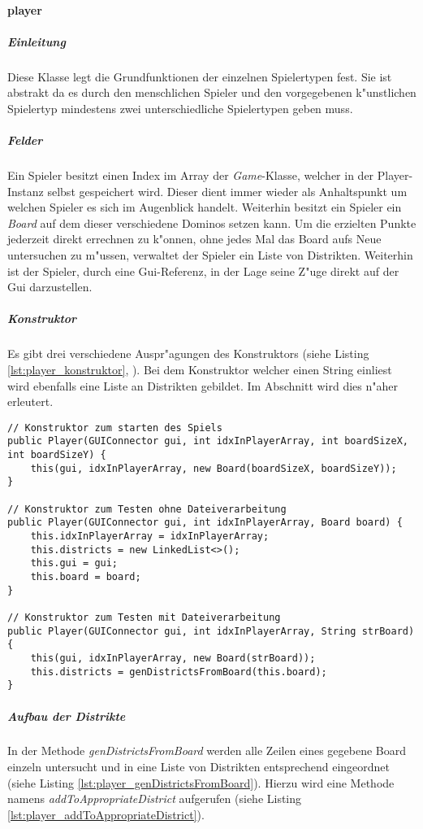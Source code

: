 \paragraph{player}
\label{par:Player}
\subparagraph{Einleitung}
Diese Klasse legt die Grundfunktionen der einzelnen Spielertypen fest. Sie ist abstrakt da es durch den menschlichen Spieler und den vorgegebenen k"unstlichen Spielertyp mindestens zwei unterschiedliche Spielertypen geben muss. 

\subparagraph{Felder}
Ein Spieler besitzt einen Index im Array der \emph{Game}-Klasse, welcher in der Player-Instanz selbst gespeichert wird. Dieser dient immer wieder als Anhaltspunkt um welchen Spieler es sich im Augenblick handelt. Weiterhin besitzt ein Spieler ein \emph{Board} auf dem dieser verschiedene Dominos setzen kann. Um die erzielten Punkte jederzeit direkt errechnen zu k"onnen, ohne jedes Mal das Board aufs Neue untersuchen zu m"ussen, verwaltet der Spieler ein Liste von Distrikten. Weiterhin ist der Spieler, durch eine Gui-Referenz, in der Lage seine Z"uge direkt auf der Gui darzustellen. 

\subparagraph{Konstruktor}
Es gibt drei verschiedene Auspr"agungen des Konstruktors (siehe Listing \ref{lst:player_konstruktor}, ). Bei dem Konstruktor welcher einen String einliest wird ebenfalls eine Liste an Distrikten gebildet. Im Abschnitt  wird dies n"aher erleutert.

\begin{lstlisting}[style=CodeHighlighting,float,caption=Player - Konstruktoren,label=lst:player_konstruktor]
// Konstruktor zum starten des Spiels
public Player(GUIConnector gui, int idxInPlayerArray, int boardSizeX, int boardSizeY) {
    this(gui, idxInPlayerArray, new Board(boardSizeX, boardSizeY));
}

// Konstruktor zum Testen ohne Dateiverarbeitung
public Player(GUIConnector gui, int idxInPlayerArray, Board board) {
    this.idxInPlayerArray = idxInPlayerArray;
    this.districts = new LinkedList<>();
    this.gui = gui;
    this.board = board;
}

// Konstruktor zum Testen mit Dateiverarbeitung
public Player(GUIConnector gui, int idxInPlayerArray, String strBoard) {
    this(gui, idxInPlayerArray, new Board(strBoard));
    this.districts = genDistrictsFromBoard(this.board);
}
\end{lstlisting}


\subparagraph{Aufbau der Distrikte}
\label{spar:aufbauDerDistrikte}
In der Methode \emph{genDistrictsFromBoard} werden alle Zeilen eines gegebene Board einzeln untersucht und in eine Liste von Distrikten entsprechend eingeordnet (siehe Listing \ref{lst:player_genDistrictsFromBoard}). Hierzu wird eine Methode namens \emph{addToAppropriateDistrict} aufgerufen (siehe Listing \ref{lst:player_addToAppropriateDistrict}). 

